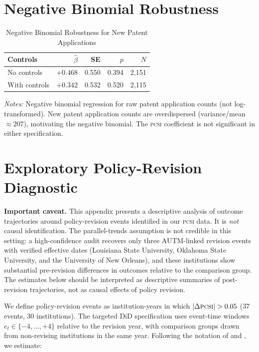 \documentclass[12pt]{article}
\newcommand{\PCSI}{\textsc{pcsi}}
\begin{document}
\section{Negative Binomial Robustness}
\label{app:negbin}

\begin{table}[htbp]
\centering
\caption{Negative Binomial Robustness for New Patent Applications}
\label{tab:b2}
\begin{threeparttable}
\begin{tabular}{lrrrr}
\toprule
Controls & $\hat\beta$ & SE & $p$ & $N$ \\
\midrule
No controls & $+0.468$ & 0.550 & 0.394 & 2,151 \\
With controls & $+0.342$ & 0.532 & 0.520 & 2,115 \\
\bottomrule
\end{tabular}
\begin{tablenotes}
\small
\item \textit{Notes:} Negative binomial regression for raw patent application
counts (not log-transformed). New patent application counts are overdispersed
(variance/mean $\approx 207$), motivating the negative binomial. The \PCSI{}
coefficient is not significant in either specification.
\end{tablenotes}
\end{threeparttable}
\end{table}

\section{Exploratory Policy-Revision Diagnostic}
\label{app:eventdiag}

\textbf{Important caveat.} This appendix presents a descriptive analysis of
outcome trajectories around policy-revision events identified in our \PCSI{} data.
It is \emph{not} causal identification. The parallel-trends assumption is not
credible in this setting: a high-confidence audit recovers only three AUTM-linked
revision events with verified effective dates (Louisiana State University, Oklahoma
State University, and the University of New Orleans), and these institutions show
substantial pre-revision differences in outcomes relative to the comparison group.
The estimates below should be interpreted as descriptive summaries of post-revision
trajectories, not as causal effects of policy revision.

We define policy-revision events as institution-years in which $|\Delta\PCSI{}|>0.05$
(37 events, 30 institutions). The targeted DiD specification uses event-time windows
$e_t \in \{-4,\ldots,+4\}$ relative to the revision year, with comparison groups
drawn from non-revising institutions in the same year. Following the notation of
\citet{callaway2021} and \citet{sunabr2021}, we estimate:
\end{document}
